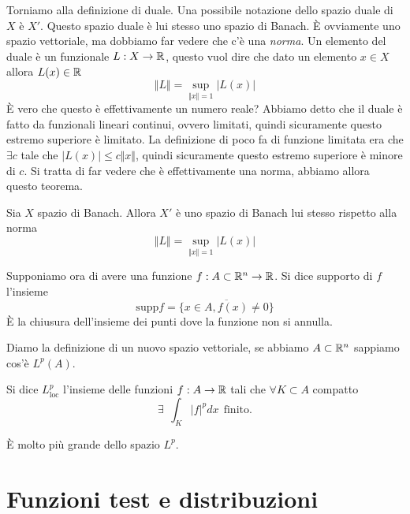 Torniamo alla definizione di duale. Una possibile notazione dello spazio duale di $X$ è $X'$. Questo spazio duale è lui stesso uno spazio di Banach. È ovviamente uno spazio vettoriale, ma dobbiamo far vedere che c'è una \textit{norma}. Un elemento del duale è un funzionale $L: X\rightarrow \mathbb{R}$, questo vuol dire che dato un elemento $x\in X$ allora $L(x) \in \mathbb{R}$
\begin{equation*}
\Vert L \Vert = \sup_{ \Vert x \Vert = 1}| L(x)|
\end{equation*}
È vero che questo è effettivamente un numero reale? Abbiamo detto che il duale è fatto da funzionali lineari continui, ovvero limitati, quindi sicuramente questo estremo superiore è limitato. La definizione di poco fa di funzione limitata era che $\exists c$ tale che $| L(x)| \leq c \Vert x \Vert $, quindi sicuramente questo estremo superiore è minore di $c$. Si tratta di far vedere che è effettivamente una norma, abbiamo allora questo teorema.
\begin{thm}
Sia $X$ spazio di Banach. Allora $X'$ è uno spazio di Banach lui stesso rispetto alla norma
\begin{equation*}
\Vert L \Vert = \sup_{ \Vert x \Vert = 1}| L(x)|
\end{equation*}
\end{thm}
\begin{defn}
Supponiamo ora di avere una funzione $f: A\subset \mathbb{R}^{n}\rightarrow \mathbb{R}$. Si dice supporto di $f$ l'insieme
\begin{equation*}
\mathrm{supp} f = \overline{\{x\in A, f(x) \neq 0\}}
\end{equation*}
È la chiusura dell'insieme dei punti dove la funzione non si annulla.
\end{defn}
Diamo la definizione di un nuovo spazio vettoriale, se abbiamo $A\subset \mathbb{R}^{n}$ sappiamo cos'è $L^{p}(A)$.
\begin{defn}
Si dice $L^{p}_{\mathrm{loc}}$ l'insieme delle funzioni $f: A\rightarrow \mathbb{R}$ tali che $\forall K\subset A$ compatto
\begin{equation*}
\exists \ \ \int_{K}| f|^{p} dx\ \ \text{finito} .
\end{equation*}
\end{defn}
È molto più grande dello spazio $L^{p}$.

\section{Funzioni test e distribuzioni}

